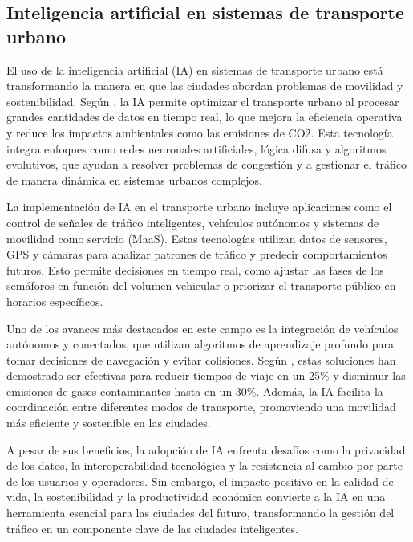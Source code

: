 \subsection{Inteligencia artificial en sistemas de transporte urbano}
El uso de la inteligencia artificial (IA) en sistemas de transporte urbano está transformando la manera en que las ciudades abordan problemas de movilidad y sostenibilidad. Según \cite{Nikitas2020}, la IA permite optimizar el transporte urbano al procesar grandes cantidades de datos en tiempo real, lo que mejora la eficiencia operativa y reduce los impactos ambientales como las emisiones de CO2. Esta tecnología integra enfoques como redes neuronales artificiales, lógica difusa y algoritmos evolutivos, que ayudan a resolver problemas de congestión y a gestionar el tráfico de manera dinámica en sistemas urbanos complejos.

La implementación de IA en el transporte urbano incluye aplicaciones como el control de señales de tráfico inteligentes, vehículos autónomos y sistemas de movilidad como servicio (MaaS). Estas tecnologías utilizan datos de sensores, GPS y cámaras para analizar patrones de tráfico y predecir comportamientos futuros. Esto permite decisiones en tiempo real, como ajustar las fases de los semáforos en función del volumen vehicular o priorizar el transporte público en horarios específicos.

Uno de los avances más destacados en este campo es la integración de vehículos autónomos y conectados, que utilizan algoritmos de aprendizaje profundo para tomar decisiones de navegación y evitar colisiones. Según \cite{Abduljabbar2019}, estas soluciones han demostrado ser efectivas para reducir tiempos de viaje en un 25\% y disminuir las emisiones de gases contaminantes hasta en un 30\%. Además, la IA facilita la coordinación entre diferentes modos de transporte, promoviendo una movilidad más eficiente y sostenible en las ciudades.

A pesar de sus beneficios, la adopción de IA enfrenta desafíos como la privacidad de los datos, la interoperabilidad tecnológica y la resistencia al cambio por parte de los usuarios y operadores. Sin embargo, el impacto positivo en la calidad de vida, la sostenibilidad y la productividad económica convierte a la IA en una herramienta esencial para las ciudades del futuro, transformando la gestión del tráfico en un componente clave de las ciudades inteligentes.

